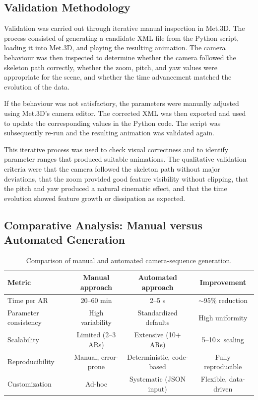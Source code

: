 \documentclass[journal abbreviation, manuscript]{copernicus}
\begin{document}
\subsection{Validation Methodology}

Validation was carried out through iterative manual inspection in Met.3D. The process consisted of generating a candidate XML file from the Python script, loading it into Met.3D, and playing the resulting animation. The camera behaviour was then inspected to determine whether the camera followed the skeleton path correctly, whether the zoom, pitch, and yaw values were appropriate for the scene, and whether the time advancement matched the evolution of the data.

If the behaviour was not satisfactory, the parameters were manually adjusted using Met.3D's camera editor. The corrected XML was then exported and used to update the corresponding values in the Python code. The script was subsequently re-run and the resulting animation was validated again.

This iterative process was used to check visual correctness and to identify parameter ranges that produced suitable animations. The qualitative validation criteria were that the camera followed the skeleton path without major deviations, that the zoom provided good feature visibility without clipping, that the pitch and yaw produced a natural cinematic effect, and that the time evolution showed feature growth or dissipation as expected.

\subsection{Comparative Analysis: Manual versus Automated Generation}

\begin{table}[htbp]
\centering
\caption{Comparison of manual and automated camera-sequence generation.}
\label{tab:manual-vs-automated}
\begin{tabular}{lccc}
\hline
\textbf{Metric} & \textbf{Manual approach} & \textbf{Automated approach} & \textbf{Improvement} \\
\hline
Time per AR & 20--60 min & 2--5 s & $\sim$95\% reduction \\
Parameter consistency & High variability & Standardized defaults & High uniformity \\
Scalability & Limited (2--3 ARs) & Extensive (10+ ARs) & 5--10$\times$ scaling \\
Reproducibility & Manual, error-prone & Deterministic, code-based & Fully reproducible \\
Customization & Ad-hoc & Systematic (JSON input) & Flexible, data-driven \\
\hline
\end{tabular}
\end{table}
\end{document}

